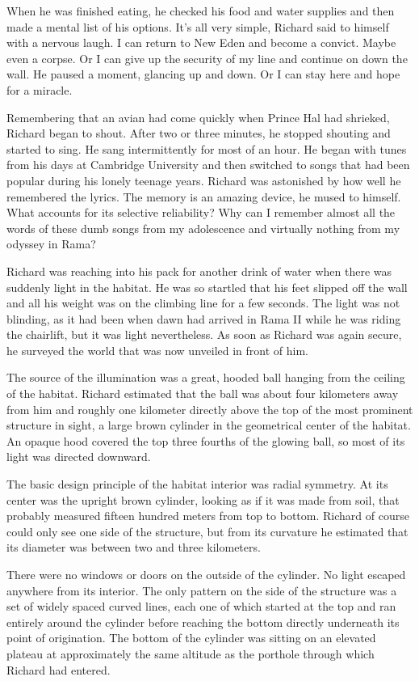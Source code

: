 \documentclass[]{article}
\begin{document}
{When he was finished eating, he checked his food and water supplies and then made a mental list of his options. It’s all very simple, Richard said to himself with a nervous laugh. I can return to New Eden and become a convict. Maybe even a corpse. Or I can give up the security of my line and continue on down the wall. He paused a moment, glancing up and down. Or I can stay here and hope for a miracle.

Remembering that an avian had come quickly when Prince Hal had shrieked, Richard began to shout. After two or three minutes, he stopped shouting and started to sing. He sang intermittently for most of an hour. He began with tunes from his days at Cambridge University and then switched to songs that had been popular during his lonely teenage years. Richard was astonished by how well he remembered the lyrics. The memory is an amazing device, he mused to himself. What accounts for its selective reliability? Why can I remember almost all the words of these dumb songs from my adolescence and virtually nothing from my odyssey in Rama?

Richard was reaching into his pack for another drink of water when there was suddenly light in the habitat. He was so startled that his feet slipped off the wall and all his weight was on the climbing line for a few seconds. The light was not blinding, as it had been when dawn had arrived in Rama II while he was riding the chairlift, but it was light nevertheless. As soon as Richard was again secure, he surveyed the world that was now unveiled in front of him.

The source of the illumination was a great, hooded ball hanging from the ceiling of the habitat. Richard estimated that the ball was about four kilometers away from him and roughly one kilometer directly above the top of the most prominent structure in sight, a large brown cylinder in the geometrical center of the habitat. An opaque hood covered the top three fourths of the glowing ball, so most of its light was directed downward.

The basic design principle of the habitat interior was radial symmetry. At its center was the upright brown cylinder, looking as if it was made from soil, that probably measured fifteen hundred meters from top to bottom. Richard of course could only see one side of the structure, but from its curvature he estimated that its diameter was between two and three kilometers.

There were no windows or doors on the outside of the cylinder. No light escaped anywhere from its interior. The only pattern on the side of the structure was a set of widely spaced curved lines, each one of which started at the top and ran entirely around the cylinder before reaching the bottom directly underneath its point of origination. The bottom of the cylinder was sitting on an elevated plateau at approximately the same altitude as the porthole through which Richard had entered.

}
\end{document}

